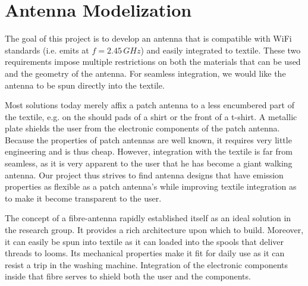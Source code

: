 \section{Antenna Modelization}
The goal of this project is to develop an antenna that is compatible with 
WiFi standards (i.e. emits at $f=2.45\,\unit{GHz}$) and easily integrated
to textile. These two requirements impose multiple restrictions on both
the materials that can be used and the geometry of the antenna. For seamless
integration, we would like the antenna to be spun directly into the textile. 

Most solutions today merely affix a patch antenna to a less 
encumbered part of the textile, e.g. on the should pads of a shirt
or the front of a t-shirt.
A metallic plate shields the user from the electronic components 
of the patch antenna. Because the properties of patch antennas are
well known, it requires very little engineering and is thus cheap. However, integration 
with the textile is far from seamless, as it is very apparent to the
user that he has become a giant walking antenna. Our project thus 
strives to find antenna designs that have emission properties
as flexible as a patch antenna's while improving textile integration
as to make it become transparent to the user.

The concept of a fibre-antenna rapidly established itself
as an ideal solution in the research group. It provides a rich
architecture upon which to build. Moreover, it can easily 
be spun into textile as it can loaded into the spools that 
deliver threads to looms. Its mechanical properties make it
fit for daily use as it can resist a trip in the washing machine. 
Integration of the electronic components inside that fibre 
serves to shield both the user and the components. 

